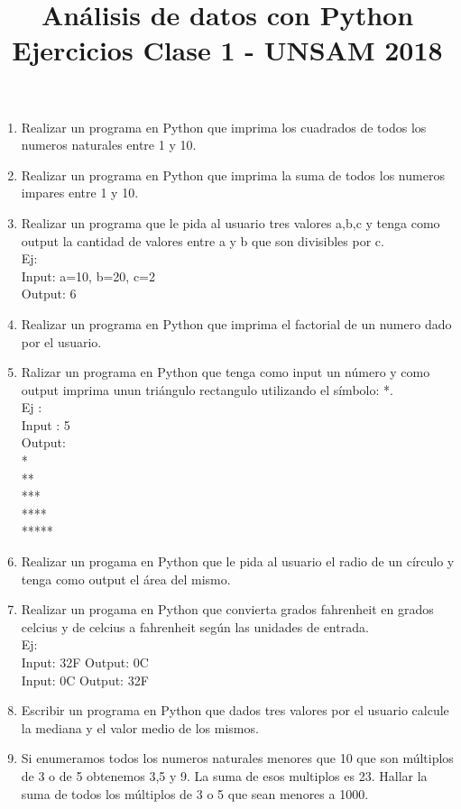 \documentclass[a4paper,10pt]{article}
\title{Análisis de datos con Python \\
Ejercicios Clase 1 - UNSAM 2018}
\author{}
\date{}
\begin{document}
\maketitle

\begin{enumerate}
\item Realizar un programa en Python que imprima los cuadrados de todos los numeros naturales entre 1 y 10.
\item Realizar un programa en Python que imprima la suma de todos los numeros impares entre 1 y 10.
\item Realizar un programa que le pida al usuario tres valores a,b,c y tenga como output la cantidad de valores entre a y b que son divisibles por c. \\
Ej: \\
Input: a=10, b=20, c=2\\
Output: 6
\item Realizar un programa en Python que imprima el factorial de un numero dado por el usuario.
\item Ralizar un programa en Python que tenga como input un número y como output imprima unun triángulo rectangulo utilizando el símbolo: *.\\
Ej :\\
Input : 5\\
Output:\\
* \\
** \\
*** \\
**** \\
***** \\

\item  Realizar un progama en Python que le pida al usuario el radio de un círculo y tenga como output el área del mismo.
\item Realizar un progama en Python que convierta grados fahrenheit en grados celcius y de celcius a fahrenheit según las unidades de entrada.\\
Ej:\\
Input: 32F  Output: 0C \\
Input: 0C   Output: 32F
\item Escribir un programa en Python que dados tres valores por el usuario calcule la mediana y el valor medio de los mismos.
\item Si enumeramos todos los numeros naturales menores que 10 que son múltiplos de 3 o de 5 obtenemos 3,5 y 9. La suma de esos multiplos es 23. Hallar la suma de todos los múltiplos de 3 o 5 que sean menores a 1000.


\end{enumerate}
\end{document}
